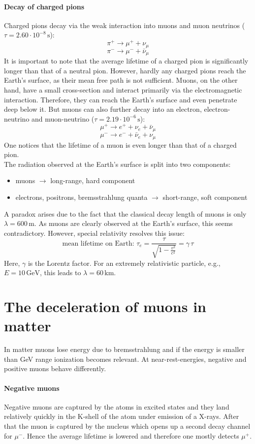 \paragraph{Decay of charged pions}
Charged pions decay via the weak interaction into muons and muon neutrinos ($\tau = 2.60 \cdot 10^{-8}\, \text{s}$):
\[
\pi^+ \rightarrow \mu^+ + \nu_\mu
\]
\[
\pi^- \rightarrow \mu^- + \bar{\nu}_\mu
\]
It is important to note that the average lifetime of a charged pion is significantly longer than that of a neutral pion. However, hardly any charged pions reach the Earth's surface, as their mean free path is not sufficient. Muons, on the other hand, have a small cross-section and interact primarily via the electromagnetic interaction. Therefore, they can reach the Earth's surface and even penetrate deep below it. But muons can also further decay into an electron, electron-neutrino and muon-neutrino ($\tau = 2.19 \cdot 10^{-6}\, \text{s}$):
\[
\mu^+ \rightarrow e^+ + \nu_e + \bar{\nu}_\mu
\]
\[
\mu^- \rightarrow e^- + \bar{\nu}_e + \nu_\mu
\]
One notices that the lifetime of a muon is even longer than that of a charged pion.\\
The radiation observed at the Earth's surface is split into two components:
\begin{itemize}
\item muons $\rightarrow$ long-range, hard component
\item electrons, positrons, bremsstrahlung quanta $\rightarrow$ short-range, soft component
\end{itemize}
A paradox arises due to the fact that the classical decay length of muons is only $\lambda = 600\, \text{m}$. As muons are clearly observed at the Earth's surface, this seems contradictory. However, special relativity resolves this issue:
\[
\text{mean lifetime on Earth: } \tau_e = \frac{\tau}{\sqrt{1 - \frac{v^2}{c^2}}} = \gamma \,\tau
\]
Here, $\gamma$ is the Lorentz factor. For an extremely relativistic particle, e.g., $E = 10\, \text{GeV}$, this leads to $\lambda = 60 \, \text{km}$.

\section{The deceleration of muons in matter}
In matter muons lose energy due to bremsstrahlung and if the energy is smaller than GeV range ionization becomes relevant. At near-rest-energies, negative and positive muons behave differently.
\paragraph{Negative muons}
Negative muons are captured by the atoms in excited states and they land relatively quickly in the K-shell of the atom under emission of a X-rays. After that the muon is captured by the nucleus which opens up a second decay channel for $\mu^-$. Hence the average lifetime is lowered and therefore one mostly detects $\mu^+$.
